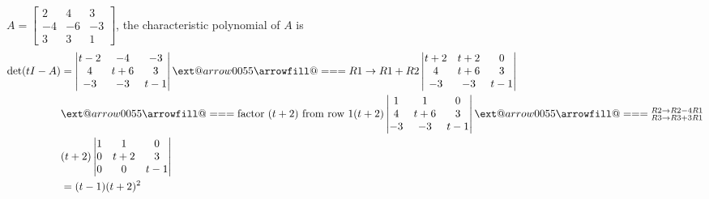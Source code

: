 \documentclass{beamer}
\makeatletter
\newcommand*{\Relbarfill@}{\arrowfill@\Relbar\Relbar\Relbar}
\newcommand*{\xequal}[2][]{\ext@arrow 0055\Relbarfill@{#1}{#2}}
\theoremstyle{definition}
\theoremstyle{remark}
\makeatother
\begin{document}
\begin{frame}[t]
\begin{example}\label{09:29-07/07/2022}
$A = \begin{bmatrix}
2&4&3\\
-4&-6&-3\\
3&3&1
\end{bmatrix}$, the characteristic polynomial of $A$ is\pause
\begin{align*}
\det(tI-A)&=\left|\begin{matrix}
t-2&-4&-3\\
4&t+6&3\\
-3&-3&t-1
\end{matrix}\right|\xequal{R1\rightarrow R1+R2}\left|\begin{matrix}
t+2&t+2&0\\
4&t+6&3\\
-3&-3&t-1
\end{matrix}\right|\\
&\xequal{\text{factor $(t+2)$ from row 1}}(t+2)\left|\begin{matrix}
1&1&0\\
4&t+6&3\\
-3&-3&t-1
\end{matrix}\right|\xequal{\substack{R2\rightarrow R2-4R1\\R3\rightarrow R3+3R1}}\\
&(t+2)\left|\begin{matrix}
1&1&0\\
0&t+2&3\\
0&0&t-1
\end{matrix}\right|\\
&=(t-1)(t+2)^2
\end{align*}
\end{example}
\end{frame}
\end{document}
